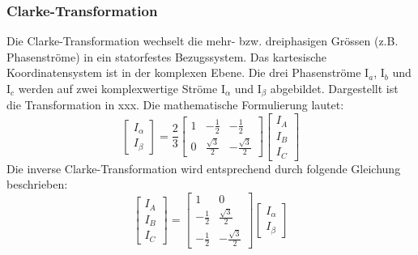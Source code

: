 \subsubsection*{Clarke-Transformation}
Die Clarke-Transformation wechselt die mehr- bzw. dreiphasigen Grössen (z.B. Phasenströme) in ein statorfestes Bezugssystem. Das kartesische Koordinatensystem ist in der komplexen Ebene. Die drei Phasenströme I$_{a}$, I$_{b}$ und I$_{c}$ werden auf zwei komplexwertige Ströme I$_{\alpha}$ und I$_{\beta}$ abgebildet. Dargestellt ist die Transformation in xxx.
Die mathematische Formulierung lautet:
\begin{equation}\label{ClarkeTrafo}
\left[
\begin{array}{c}
I_\alpha \\ 
I_\beta
\end{array} 
\right]
= \frac{2}{3}
\left[
\begin{array}{ccc}
1 & -\frac{1}{2} & -\frac 12 \\ 
0 & \frac{\sqrt{3}}{2} & -\frac{\sqrt{3}}{2}
\end{array} 
\right] 
\left[
\begin{array}{c}
I_A \\ 
I_B \\
I_C
\end{array} 
\right]
\end{equation}
Die inverse Clarke-Transformation wird entsprechend durch folgende Gleichung beschrieben:
\begin{equation}\label{invClarkeTrafo}
\left[
\begin{array}{c}
I_A \\ 
I_B \\
I_C
\end{array} 
\right]
= 
\left[
\begin{array}{cc}
1 & 0 \\
-\frac{1}{2} & \frac{\sqrt{3}}{2} \\
-\frac 12  & -\frac{\sqrt{3}}{2}
\end{array} 
\right] 
\left[
\begin{array}{c}
I_\alpha \\ 
I_\beta
\end{array} 
\right]
\end{equation}



